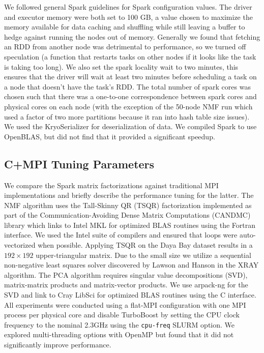 We followed general Spark guidelines for Spark configuration values. The driver and executor memory were both set to 100 GB, a value chosen to maximize the memory available for data caching and shuffling while still leaving a buffer to hedge against running the nodes out of memory.  Generally we found that fetching an RDD from another node was detrimental to performance, so we turned off speculation (a function that restarts tasks on other nodes if it looks like the task is taking too long). We also set the spark locality wait to two minutes, this ensures that the driver will wait at least two minutes before scheduling a task on a node that doesn't have the task's RDD. The total number of spark cores was chosen such that there was a one-to-one correspondence between spark cores and physical cores on each node (with the exception of the 50-node NMF run which used a factor of two more partitions because it ran into hash table size issues). We used the KryoSerializer for deserialization of data. We compiled Spark to use OpenBLAS, but did not find that it provided a significant speedup.

\subsection{C+MPI Tuning Parameters}
We compare the Spark matrix factorizations against traditional MPI implementations and briefly describe the performance tuning for the latter. The NMF algorithm uses the Tall-Skinny QR (TSQR) \cite{ballard14, Demmel12} factorization implemented as part of the Communication-Avoiding Dense Matrix Computations (CANDMC) library \cite{Solomonik14} which links to Intel MKL for optimized BLAS routines using the Fortran interface. We used the Intel suite of compilers and ensured that loops were auto-vectorized when possible. Applying TSQR on the Daya Bay dataset results in a $192 \times 192$ upper-triangular matrix. Due to the small size we utilize a sequential non-negative least squares solver discovered by Lawson and Hanson \cite{lawson95} in the XRAY algorithm. The PCA algorithm requires singular value decompositions (SVD), matrix-matrix products and matrix-vector products. We use arpack-ng \cite{Lehoucq97} for the SVD and link to Cray LibSci for optimized BLAS routines using the C interface. All experiments were conducted using a flat-MPI configuration with one MPI process per physical core and disable TurboBoost by setting the CPU clock frequency to the nominal 2.3GHz using the \verb+cpu-freq+ SLURM option. We explored multi-threading options with OpenMP but found that it did not significantly improve performance.